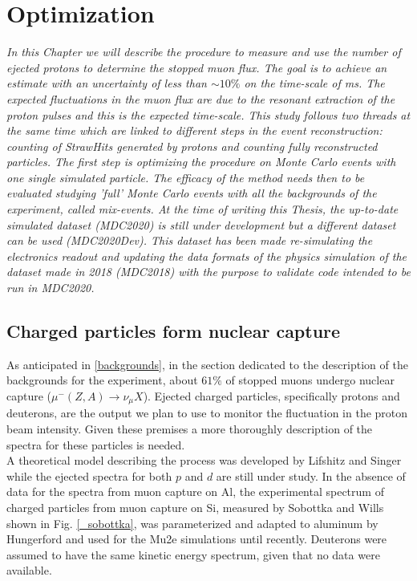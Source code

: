 \documentclass[12pt,a4paper,openright, oneside, titlepage]{book} %
\begin{document}
\chapter{Optimization}
{\itshape In this Chapter we will describe the procedure to measure and use the number of ejected protons to determine the stopped muon flux. 
The goal is to achieve an estimate with an uncertainty of less than $\sim10\%$ on the time-scale of ms. 
The expected fluctuations in the muon flux are due to the resonant extraction of the proton pulses and this is the expected time-scale. 
This study follows two threads at the same time which are linked to different steps in the event reconstruction: counting of StrawHits generated by protons and counting fully reconstructed particles. 
The first step is optimizing the procedure on Monte Carlo events with one single simulated particle. 
The efficacy of the method needs then to be evaluated studying 'full' Monte Carlo events with all the backgrounds of the experiment, called \textit{mix-events}. 
At the time of writing this Thesis, the up-to-date simulated dataset (MDC2020) is still under development but a different dataset can be used (MDC2020Dev). 
This dataset has been made re-simulating the electronics readout and updating the data formats of the physics simulation of the dataset made in 2018 (MDC2018) with the purpose to validate code intended to be run in MDC2020.}

\section{Charged particles form nuclear capture}
As anticipated in \ref{backgrounds}, in the section dedicated to the description of the backgrounds for the experiment, about $61\%$ of stopped muons undergo nuclear capture ($\mu^-(Z,A)\rightarrow \nu_\mu X$). 
Ejected charged particles, specifically protons and deuterons, are the output we plan to use to monitor the fluctuation in the proton beam intensity. 
Given these premises a more thoroughly description of the spectra for these particles is needed.\\
A theoretical model describing the process was developed by Lifshitz and Singer \cite{Lifshitz} while the ejected spectra for both $p$ and $d$ are still under study. 
In the absence of data for the spectra from muon capture on Al, the experimental spectrum of charged particles from muon capture on Si, measured by Sobottka and Wills \cite{Sobottka} shown in Fig. \ref{_sobottka}, was parameterized and adapted to aluminum by Hungerford \cite{Hungerford} and used for the Mu2e simulations until recently. 
Deuterons were assumed to have the same kinetic energy spectrum, given that no data were available.\\
\end{document}
